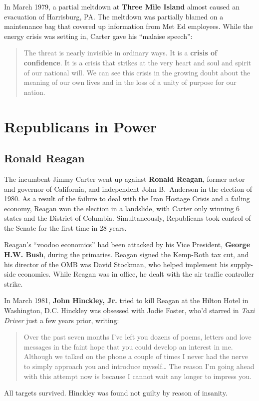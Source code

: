 In March 1979, a partial meltdown at \textbf{Three Mile Island} almost caused an evacuation of Harrisburg, PA\@.
The meltdown was partially blamed on a maintenance bag that covered up information from Met Ed employees.
While the energy crisis was setting in, Carter gave his ``malaise speech'':
\begin{quote}
 The threat is nearly invisible in ordinary ways.
 It is a \textbf{crisis of confidence}.
 It is a crisis that strikes at the very heart and soul and spirit of our national will.
 We can see this crisis in the growing doubt about the meaning of our own lives
 and in the loss of a unity of purpose for our nation.
\end{quote}

\section{Republicans in Power}

\subsection*{Ronald Reagan}

The incumbent Jimmy Carter went up against \textbf{Ronald Reagan}, former actor and governor of California,
and independent John B.\ Anderson in the election of 1980.
As a result of the failure to deal with the Iran Hostage Crisis and a failing economy,
Reagan won the election in a landslide, with Carter only winning 6 states and the District of Columbia.
Simultaneously, Republicans took control of the Senate for the first time in 28 years.

Reagan's ``voodoo economics'' had been attacked by his Vice President,
\textbf{George H.W. Bush}, during the primaries.
Reagan signed the Kemp-Roth tax cut, and his director of the OMB was David Stockman,
who helped implement his supply-side economics.
While Reagan was in office, he dealt with the air traffic controller strike.

In March 1981, \textbf{John Hinckley, Jr.} tried to kill Reagan at the Hilton Hotel in Washington, D.C.
Hinckley was obsessed with Jodie Foster, who'd starred in \textit{Taxi Driver} just a few years prior, writing:
\begin{quote}
Over the past seven months I've left you dozens of poems, letters and love messages
in the faint hope that you could develop an interest in me.
Although we talked on the phone a couple of times
I never had the nerve to simply approach you and introduce myself\ldots{}
The reason I'm going ahead with this attempt now is because I cannot wait any longer to impress you.
\end{quote}
All targets survived.
Hinckley was found not guilty by reason of insanity.

